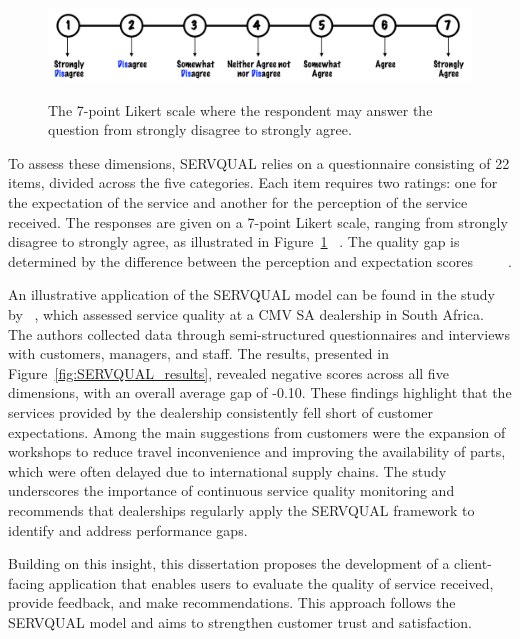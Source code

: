 \begin{figure}[h]
  \caption{The 7-point Likert scale where the respondent may answer the question from strongly disagree to strongly agree. ~\cite{master_servqual_model}}
  \centering
  \includegraphics[width=\textwidth]{figs/likert_scale}
  \label{fig:likert_scale}
\end{figure}


To assess these dimensions, SERVQUAL relies on a questionnaire consisting of 22 items, divided across the five categories. Each item requires two ratings: one for the expectation of the service and another for the perception of the service received. The responses are given on a 7-point Likert scale, ranging from strongly disagree to strongly agree, as illustrated in Figure~\ref{fig:likert_scale} ~\cite{Measuring_After_sales_Service_Quality}. The quality gap is determined by the difference between the perception and expectation scores ~\cite{servqual_blog_da_qualidade} ~\cite{Measuring_After_sales_Service_Quality} ~\cite{SERVQUAL_OLD}.

An illustrative application of the SERVQUAL model can be found in the study by ~\citet{Measuring_After_sales_Service_Quality}, which assessed service quality at a CMV SA dealership in South Africa. The authors collected data through semi-structured questionnaires and interviews with customers, managers, and staff. The results, presented in Figure~\ref{fig:SERVQUAL_results}, revealed negative scores across all five dimensions, with an overall average gap of -0.10. These findings highlight that the services provided by the dealership consistently fell short of customer expectations. Among the main suggestions from customers were the expansion of workshops to reduce travel inconvenience and improving the availability of parts, which were often delayed due to international supply chains. The study underscores the importance of continuous service quality monitoring and recommends that dealerships regularly apply the SERVQUAL framework to identify and address performance gaps.

Building on this insight, this dissertation proposes the development of a client-facing application that enables users to evaluate the quality of service received, provide feedback, and make recommendations. This approach follows the SERVQUAL model and aims to strengthen customer trust and satisfaction.


